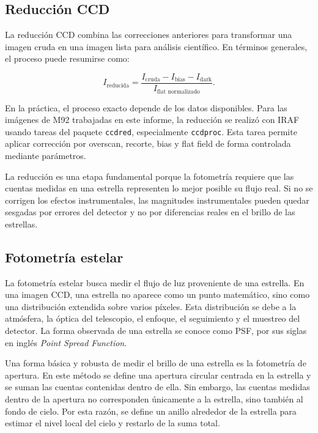 \documentclass[12pt,letterpaper]{article}
\begin{document}
\subsection{Reducción CCD}

La reducción CCD combina las correcciones anteriores para transformar una imagen cruda en una imagen lista para análisis científico. En términos generales, el proceso puede resumirse como:

\begin{equation}
    I_{\text{reducida}} =
    \frac{
    I_{\text{cruda}} - I_{\text{bias}} - I_{\text{dark}}
    }{
    I_{\text{flat normalizado}}
    }.
\end{equation}

En la práctica, el proceso exacto depende de los datos disponibles. Para las imágenes de M92 trabajadas en este informe, la reducción se realizó con IRAF usando tareas del paquete \texttt{ccdred}, especialmente \texttt{ccdproc}. Esta tarea permite aplicar corrección por overscan, recorte, bias y flat field de forma controlada mediante parámetros.

La reducción es una etapa fundamental porque la fotometría requiere que las cuentas medidas en una estrella representen lo mejor posible su flujo real. Si no se corrigen los efectos instrumentales, las magnitudes instrumentales pueden quedar sesgadas por errores del detector y no por diferencias reales en el brillo de las estrellas.

\subsection{Fotometría estelar}

La fotometría estelar busca medir el flujo de luz proveniente de una estrella. En una imagen CCD, una estrella no aparece como un punto matemático, sino como una distribución extendida sobre varios píxeles. Esta distribución se debe a la atmósfera, la óptica del telescopio, el enfoque, el seguimiento y el muestreo del detector. La forma observada de una estrella se conoce como PSF, por sus siglas en inglés \textit{Point Spread Function}.

Una forma básica y robusta de medir el brillo de una estrella es la fotometría de apertura. En este método se define una apertura circular centrada en la estrella y se suman las cuentas contenidas dentro de ella. Sin embargo, las cuentas medidas dentro de la apertura no corresponden únicamente a la estrella, sino también al fondo de cielo. Por esta razón, se define un anillo alrededor de la estrella para estimar el nivel local del cielo y restarlo de la suma total.
\end{document}
